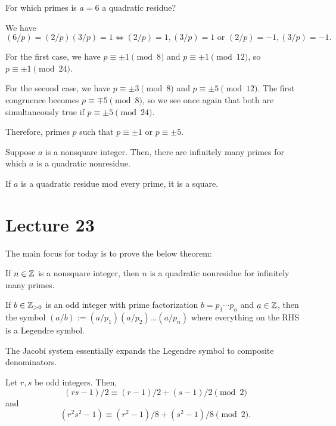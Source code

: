 \documentclass{article}
\begin{document}
\begin{example} 
	For which primes is $a = 6$ a quadratic residue?
\end{example}

We have \[(6 / p) = (2 / p) (3 / p) = 1 \iff (2 / p) = 1, (3 / p) = 1 \text{ or } (2 / p) = -1, (3 / p) = -1.\]

For the first case, we have $p \equiv \pm 1 \pmod 8$ and $p \equiv \pm 1 \pmod{12}$, so $p \equiv \pm 1 \pmod{24}$.

For the second case, we have $p \equiv \pm 3 \pmod 8$ and $p \equiv \pm 5 \pmod{12}$. The first congruence becomes $p \equiv \mp 5 \pmod 8$, so we see once again that both are simultaneously true if $p \equiv \pm 5 \pmod 24$.

Therefore, primes $p$ such that $p \equiv \pm 1$ or $p \equiv \pm 5$.

\begin{theorem}
	Suppose $a$ is a nonsquare integer. Then, there are infinitely many primes for which $a$ is a quadratic nonresidue.
\end{theorem}

\begin{corollary} 
	If $a$ is a quadratic residue mod every prime, it is a square. 
\end{corollary}

\section{Lecture 23}
The main focus for today is to prove the below theorem:
\begin{theorem}
	If $n \in \mathbb Z$ is a nonsquare integer, then $n$ is a quadratic nonresidue for infinitely many primes.
\end{theorem}

\begin{definition} 
	If $b \in \mathbb Z_{>0}$ is an odd integer with prime factorization $b = p_1 \cdots p_n$ and $a \in \mathbb Z$, then the symbol $(a/b) := (a/p_1)(a/p_2)\ldots(a/p_n)$ where 
	everything on the RHS is a Legendre symbol.
\end{definition}
The Jacobi system essentially expands the Legendre symbol to composite denominators.

\begin{lemma}
	Let $r, s$ be odd integers. Then, $$(rs - 1)/ 2 \equiv (r-1)/2 + (s-1)/2 \pmod 2$$ and $$(r^2s^2 - 1) \equiv (r^2 - 1)/8 + (s^2 - 1)/ 8 \pmod 2.$$
\end{lemma}
\end{document}
